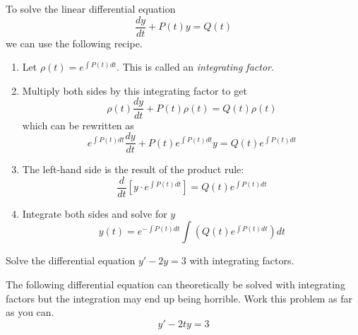 \begin{technique}
    To solve the linear differential equation
    \[ \frac{dy}{dt} + P(t) y = Q(t) \]
    we can use the following recipe.  
    \begin{enumerate}
        \item Let $\rho(t) = e^{\int P(t) dt}$.  This is called an {\it integrating factor}.
        \item Multiply both sides by this integrating factor to get
            \[ \rho(t) \frac{dy}{dt} + P(t) \rho(t) = Q(t) \rho(t) \]
            which can be rewritten as
            \[ e^{\int P(t) dt} \frac{dy}{dt} + P(t) e^{\int P(t) dt} y = Q(t) e^{\int P(t)
            dt} \]
        \item The left-hand side is the result of the product rule:
            \[ \frac{d}{dt} \left[ y \cdot e^{\int P(t) dt} \right] = Q(t) e^{\int P(t) dt} \]
        \item Integrate both sides and solve for $y$
            \[ y(t) = e^{-\int P(t) dt} \int \left( Q(t) e^{\int P(t) dt} \right) dt \]
    \end{enumerate}
\end{technique}

\begin{problem}
    Solve the differential equation $y' -2 y = 3$ with integrating factors.
\end{problem}

\begin{problem}
    The following differential equation can theoretically be solved with integrating
    factors but the integration may end up being horrible.  Work this problem as far as
    you can.
    \[ y' - 2ty = 3 \]
\end{problem}


